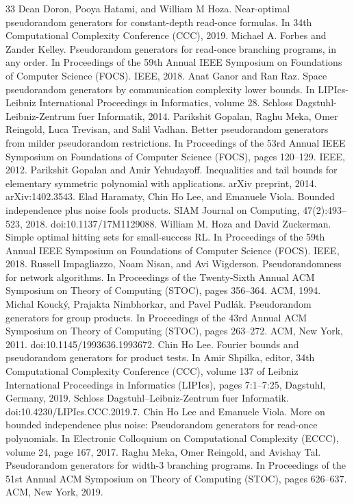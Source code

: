 \documentclass[10pt,a4paper]{article}
\begin{document}
\begin{thebibliography}{33}
 Dean Doron, Pooya Hatami, and William M Hoza. Near-optimal pseudorandom generators for constant-depth read-once formulas. In 34th Computational Complexity Conference (CCC), 2019.
 Michael A. Forbes and Zander Kelley. Pseudorandom generators for read-once branching programs, in any order. In Proceedings of the 59th Annual IEEE Symposium on Foundations of Computer Science (FOCS). IEEE, 2018.
 Anat Ganor and Ran Raz. Space pseudorandom generators by communication complexity lower bounds. In LIPIcs-Leibniz International Proceedings in Informatics, volume 28. Schloss Dagstuhl-Leibniz-Zentrum fuer Informatik, 2014.
 Parikshit Gopalan, Raghu Meka, Omer Reingold, Luca Trevisan, and Salil Vadhan. Better pseudorandom generators from milder pseudorandom restrictions. In Proceedings of the 53rd Annual IEEE Symposium on Foundations of Computer Science (FOCS), pages 120–129. IEEE, 2012.
 Parikshit Gopalan and Amir Yehudayoff. Inequalities and tail bounds for elementary symmetric polynomial with applications. arXiv preprint, 2014. arXiv:1402.3543.
 Elad Haramaty, Chin Ho Lee, and Emanuele Viola. Bounded independence plus noise fools products. SIAM Journal on Computing, 47(2):493–523, 2018. doi:10.1137/17M1129088.
 William M. Hoza and David Zuckerman. Simple optimal hitting sets for small-success RL. In Proceedings of the 59th Annual IEEE Symposium on Foundations of Computer Science (FOCS). IEEE, 2018.
 Russell Impagliazzo, Noam Nisan, and Avi Wigderson. Pseudorandomness for network algorithms. In Proceedings of the Twenty-Sixth Annual ACM Symposium on Theory of Computing (STOC), pages 356–364. ACM, 1994.
 Michal Koucký, Prajakta Nimbhorkar, and Pavel Pudlák. Pseudorandom generators for group products. In Proceedings of the 43rd Annual ACM Symposium on Theory of Computing (STOC), pages 263–272. ACM, New York, 2011. doi:10.1145/1993636.1993672.
 Chin Ho Lee. Fourier bounds and pseudorandom generators for product tests. In Amir Shpilka, editor, 34th Computational Complexity Conference (CCC), volume 137 of Leibniz International Proceedings in Informatics (LIPIcs), pages 7:1–7:25, Dagstuhl, Germany, 2019. Schloss Dagstuhl–Leibniz-Zentrum fuer Informatik. doi:10.4230/LIPIcs.CCC.2019.7.
 Chin Ho Lee and Emanuele Viola. More on bounded independence plus noise: Pseudorandom generators for read-once polynomials. In Electronic Colloquium on Computational Complexity (ECCC), volume 24, page 167, 2017.
 Raghu Meka, Omer Reingold, and Avishay Tal. Pseudorandom generators for width-3 branching programs. In Proceedings of the 51st Annual ACM Symposium on Theory of Computing (STOC), pages 626–637. ACM, New York, 2019.

\end{thebibliography}
\end{document}

